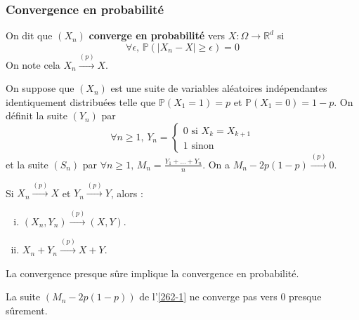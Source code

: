	\subsubsection{Convergence en probabilité}


	\begin{definition}
		On dit que $(X_n)$ \textbf{converge en probabilité} vers $X : \Omega \rightarrow \mathbb{R}^d$ si
		\[ \forall \epsilon, \, \mathbb{P}(\vert X_n - X \vert \geq \epsilon) = 0 \]
		On note cela $X_n \overset{(p)}{\longrightarrow} X$.
	\end{definition}


	\begin{example}
		\label{262-1}
		On suppose que $(X_n)$ est une suite de variables aléatoires indépendantes identiquement distribuées telle que $\mathbb{P}(X_1 = 1) = p$ et $\mathbb{P}(X_1 = 0) = 1-p$. On définit la suite $(Y_n)$ par
		\[
		\forall n \geq 1, \, Y_n = \begin{cases}
			0 \text{ si } X_k = X_{k+1} \\
			1 \text{ sinon}
		\end{cases}
		\]
		et la suite $(S_n)$ par $\forall n \geq 1, \, M_n = \frac{Y_1 + \dots + Y_n}{n}$. On a $M_n - 2p(1-p) \overset{(p)}{\longrightarrow} 0$.
	\end{example}


	\begin{proposition}
		Si $X_n \overset{(p)}{\longrightarrow} X$ et $Y_n \overset{(p)}{\longrightarrow} Y$, alors :
		\begin{enumerate}[(i)]
			\item $(X_n, Y_n) \overset{(p)}{\longrightarrow} (X, Y)$.
			\item $X_n + Y_n \overset{(p)}{\longrightarrow} X + Y$.
		\end{enumerate}
	\end{proposition}

	\begin{theorem}
		La convergence presque sûre implique la convergence en probabilité.
	\end{theorem}


	\begin{cexample}
		La suite $(M_n - 2p(1-p))$ de l'\cref{262-1} ne converge pas vers $0$ presque sûrement.
	\end{cexample}

